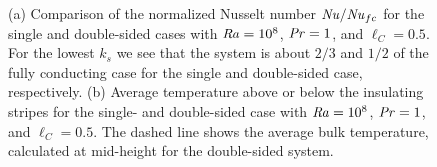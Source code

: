 \documentclass{jfm}
\newcommand\Pran{\mbox{\textit{Pr}}} %
\newcommand\Ray{\mbox{\textit{Ra}}}  %
\newcommand\Nus{\mbox{\textit{Nu}}}  %
\begin{document}
\begin{figure}
\centering
{}
{}
\label{figure8}
\caption{%
(a) Comparison of the normalized Nusselt
number $\Nus/\Nus_{fc}$ for the single and double-sided cases with
$\Ray=10^8$, $\Pran=1$, and $\ell_C=0.5$.  For the lowest $k_s$ we see
that the system is about $2/3$ and $1/2$ of the fully conducting case for
the single and double-sided case, respectively.  (b) Average temperature
above or below the insulating stripes for the single- and double-sided
case with $\Ray=10^8$, $\Pran=1$, and $\ell_C=0.5$.  The dashed line shows
the average bulk temperature, calculated at mid-height for the double-sided
system.}
\end{figure}
\end{document}
